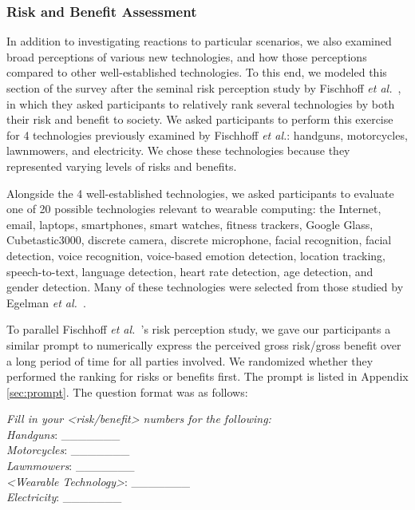 \documentclass{acm_proc_article-sp}
\def\etal{{\it et al.~}}
\begin{document}
\subsubsection{Risk and Benefit Assessment}

In addition to investigating reactions to particular scenarios, we also examined broad perceptions of various new technologies, and how those perceptions compared to other well-established technologies. To this end, we modeled this section of the survey after the seminal risk perception study by Fischhoff \etal\cite{Fischhoff}, in which they asked participants to relatively rank several technologies by both their risk and benefit to society. We asked participants to perform this exercise for 4 technologies previously examined by Fischhoff {\it et al.}: handguns, motorcycles, lawnmowers, and electricity. We chose these technologies because they represented varying levels of risks and benefits.

Alongside the 4 well-established technologies, we asked participants to evaluate one of 20 possible technologies relevant to wearable computing: the Internet, email, laptops, smartphones, smart watches, fitness trackers, Google Glass, Cubetastic3000, discrete camera, discrete microphone, facial recognition, facial detection, voice recognition, voice-based emotion detection, location tracking, speech-to-text, language detection, heart rate detection, age detection, and gender detection. Many of these technologies were selected from those studied by Egelman \etal\cite{Egelman2015}.

To parallel Fischhoff \etal's risk perception study, we gave our participants a similar prompt to numerically express the perceived gross risk/gross benefit over a long period of time for all parties involved. We randomized whether they performed the ranking for risks or benefits first. The prompt is listed in Appendix \ref{sec:prompt}. The question format was as follows:

\textit{Fill in your <risk/benefit> numbers for the following:}\\[-.5cm]

\textit{Handguns}: \_\_\_\_\_\_\_ \\
\textit{Motorcycles}: \_\_\_\_\_\_\_\\
\textit{Lawnmowers}: \_\_\_\_\_\_\_\\
\textit{<Wearable Technology>}: \_\_\_\_\_\_\_\\
\textit{Electricity}: \_\_\_\_\_\_\_\\ [-.5cm]
\end{document}
